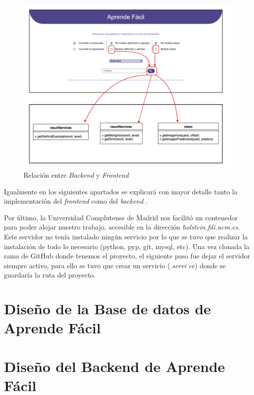 \begin{figure}[!h]
	\includegraphics[width=1.2\textwidth]{Imagenes/Bitmap/Capitulo4/RelacionBackFront.png}
	\caption{Relación entre \textit{Backend} y \textit{Frontend}}
	\label{fig:relacionBackFront}
\end{figure}


 Igualmente en los siguientes apartados se explicará con mayor detalle tanto la implementación del \textit{frontend} como del \textit{backend} . 

Por último, la Universidad Complutense de Madrid nos facilitó un contenedor para poder alojar nuestro trabajo, accesible en la dirección \textit{holstein.fdi.ucm.es}. Este servidor no tenía instalado ningún servicio por lo que se tuvo que realizar la instalación de todo lo necesario (python, pyp, git, mysql, etc). Una vez clonada la rama de GitHub donde tenemos el proyecto, el siguiente paso fue dejar el servidor siempre activo, para ello se tuvo que crear un servicio (\textit{.servi ce}) donde se guardaría la ruta del proyecto.

\section{Diseño de la Base de datos de Aprende Fácil}



\section{Diseño del Backend de Aprende Fácil}

